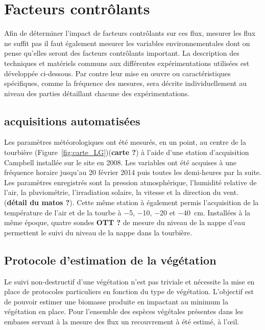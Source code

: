 %
%


\section{Facteurs contrôlants}
Afin de déterminer l'impact de facteurs contrôlants sur ces flux, mesurer les flux ne suffit pas il faut également mesurer les variables environnementales dont on pense qu'elles seront des facteurs contrôlants important.
La description des techniques et matériels communs aux différentes expérimentations utilisées est développée ci-dessous.
Par contre leur mise en œuvre ou caractéristiques spécifiques, comme la fréquence des mesures, sera décrite individuellement au niveau des parties détaillant chacune des expérimentations.

\subsection{acquisitions automatisées}

Les paramètres météorologiques ont été mesurés, en un point, au centre de la tourbière (Figure~\ref{fig:carte_LG})(\textbf{carte ?}) à l'aide d'une station d'acquisition Campbell installée sur le site en 2008.
Les variables ont été acquises à une fréquence horaire jusqu'au 20 février 2014 puis toutes les demi-heures par la suite. 
Les paramètres enregistrés sont la pression atmosphérique, l'humidité relative de l'air, la pluviométrie, l'irradiation solaire, la vitesse et la direction du vent. (\textbf{détail du matos ?}).
Cette même station à également permis l'acquisition de la température de l'air et de la tourbe à \num{-5}, \num{-10}, \num{-20} et \SIlist{-40}{\cm}.
Installées à la même époque, quatre sondes \textbf{OTT ?} de mesure du niveau de la nappe d'eau permettent le suivi du niveau de la nappe dans la tourbière.

\subsection{Protocole d'estimation de la végétation}

Le suivi non-destructif d'une végétation n'est pas triviale et nécessite la mise en place de protocoles particuliers en fonction du type de végétation.
L'objectif est de pouvoir estimer une biomasse produite en impactant au minimum la végétation en place.
Pour l'ensemble des espèces végétales présentes dans les embases servant à la mesure des flux un recouvrement à été estimé, à l’œil.


